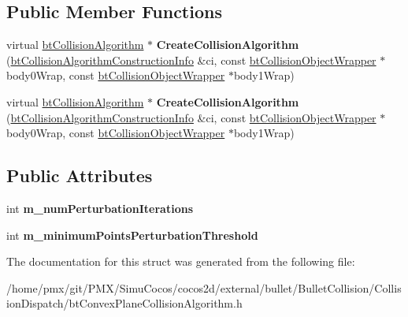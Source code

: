 \subsection*{Public Member Functions}
\begin{DoxyCompactItemize}
\item 
\mbox{\label{structbtConvexPlaneCollisionAlgorithm_1_1CreateFunc_a2a10ae82cca2eec896084e5d8d13254f}} 
virtual \hyperlink{classbtCollisionAlgorithm}{bt\+Collision\+Algorithm} $\ast$ {\bfseries Create\+Collision\+Algorithm} (\hyperlink{structbtCollisionAlgorithmConstructionInfo}{bt\+Collision\+Algorithm\+Construction\+Info} \&ci, const \hyperlink{structbtCollisionObjectWrapper}{bt\+Collision\+Object\+Wrapper} $\ast$body0\+Wrap, const \hyperlink{structbtCollisionObjectWrapper}{bt\+Collision\+Object\+Wrapper} $\ast$body1\+Wrap)
\item 
\mbox{\label{structbtConvexPlaneCollisionAlgorithm_1_1CreateFunc_a2a10ae82cca2eec896084e5d8d13254f}} 
virtual \hyperlink{classbtCollisionAlgorithm}{bt\+Collision\+Algorithm} $\ast$ {\bfseries Create\+Collision\+Algorithm} (\hyperlink{structbtCollisionAlgorithmConstructionInfo}{bt\+Collision\+Algorithm\+Construction\+Info} \&ci, const \hyperlink{structbtCollisionObjectWrapper}{bt\+Collision\+Object\+Wrapper} $\ast$body0\+Wrap, const \hyperlink{structbtCollisionObjectWrapper}{bt\+Collision\+Object\+Wrapper} $\ast$body1\+Wrap)
\end{DoxyCompactItemize}
\subsection*{Public Attributes}
\begin{DoxyCompactItemize}
\item 
\mbox{\label{structbtConvexPlaneCollisionAlgorithm_1_1CreateFunc_acc1dd2f69290d4e232ae9320dc2baed2}} 
int {\bfseries m\+\_\+num\+Perturbation\+Iterations}
\item 
\mbox{\label{structbtConvexPlaneCollisionAlgorithm_1_1CreateFunc_a3122e0acf9e61affe926ef5ea019fb10}} 
int {\bfseries m\+\_\+minimum\+Points\+Perturbation\+Threshold}
\end{DoxyCompactItemize}


The documentation for this struct was generated from the following file\+:\begin{DoxyCompactItemize}
\item 
/home/pmx/git/\+P\+M\+X/\+Simu\+Cocos/cocos2d/external/bullet/\+Bullet\+Collision/\+Collision\+Dispatch/bt\+Convex\+Plane\+Collision\+Algorithm.\+h\end{DoxyCompactItemize}
